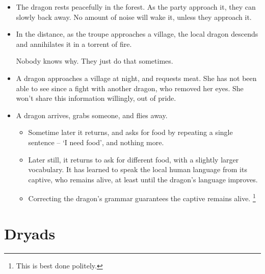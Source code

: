 \begin{multicols}{2}
\begin{itemize}
  \item
  The dragon rests peacefully in the forest.
  As the party approach it, they can slowly back away.
  No amount of noise will wake it, unless they approach it.
  \item
  In the distance, as the troupe approaches a village, the local dragon descends and annihilates it in a torrent of fire.

  Nobody knows why.
  They just do that sometimes.
  \item
  A dragon approaches a village at night, and requests meat.
  She has not been able to see since a fight with another dragon, who removed her eyes.
  She won't share this information willingly, out of pride.
  \item
  A dragon arrives, grabs someone, and flies away.
  \begin{itemize}
    \item
    Sometime later it returns, and asks for food by repeating a single sentence -- `I need food', and nothing more.
    \item
    Later still, it returns to ask for different food, with a slightly larger vocabulary.
    It has learned to speak the local human language from its captive, who remains alive, at least until the dragon's language improves.
    \item
    Correcting the dragon's grammar guarantees the captive remains alive.%
    \footnote{This is best done politely.}
  \end{itemize}
\end{itemize}

\dragon

\showStdSpells

\end{multicols}

\section[Dryad]{Dryads}
\label{dryad}

